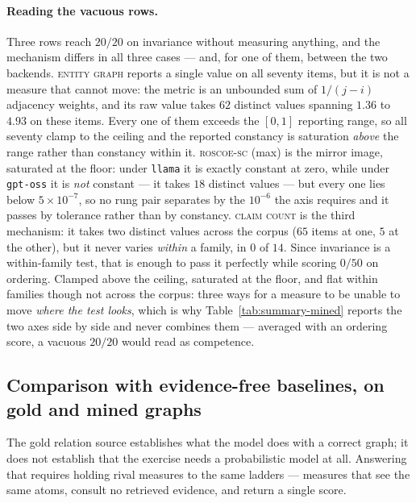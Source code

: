 \paragraph{Reading the vacuous rows.} Three rows reach $20/20$ on invariance without measuring
anything, and the mechanism differs in all three cases --- and, for one of them, between the two
backends. \textsc{entity graph} reports a single value on all seventy items, but it is not a measure
that cannot move: the metric is an unbounded sum of $1/(j-i)$ adjacency weights, and its raw value
takes $62$ distinct values spanning $1.36$ to $4.93$ on these items. Every one of them exceeds the
$[0,1]$ reporting range, so all seventy clamp to the ceiling and the reported constancy is
saturation \emph{above} the range rather than constancy within it. \textsc{roscoe-sc} (max) is the
mirror image, saturated at the floor: under \texttt{llama} it is exactly constant at zero, while
under \texttt{gpt-oss} it is \emph{not} constant --- it takes $18$ distinct values --- but every one
lies below $5\times10^{-7}$, so no rung pair separates by the $10^{-6}$ the axis requires and it
passes by tolerance rather than by constancy. \textsc{claim count} is the third mechanism: it takes
two distinct values across the corpus ($65$ items at one, $5$ at the other), but it never varies
\emph{within} a family, in $0$ of $14$. Since invariance is a within-family test, that is enough to
pass it perfectly while scoring $0/50$ on ordering. Clamped above the ceiling, saturated at the
floor, and flat within families though not across the corpus: three ways for a measure to be unable
to move \emph{where the test looks}, which is why Table~\ref{tab:summary-mined} reports the two axes
side by side and never combines them --- averaged with an ordering score, a vacuous $20/20$ would
read as competence.

\subsection{Comparison with evidence-free baselines, on gold and mined graphs}
\label{sec-baselines-measured}

The gold relation source establishes what the model does with a correct graph; it does not establish that
the exercise needs a probabilistic model at all. Answering that requires holding rival measures to the same
ladders --- measures that see the same atoms, consult no retrieved evidence, and return a single score.


